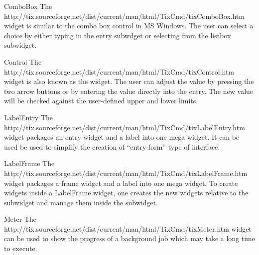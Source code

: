 
\begin{classdesc}{ComboBox}{}
The 
{http://tix.sourceforge.net/dist/current/man/html/TixCmd/tixComboBox.htm}
widget is similar to the combo box control in MS Windows. The user can
select a choice by either typing in the entry subwdget or selecting
from the listbox subwidget.
\end{classdesc}


\begin{classdesc}{Control}{}
The 
{http://tix.sourceforge.net/dist/current/man/html/TixCmd/tixControl.htm}
widget is also known as the  widget. The user can
adjust the value by pressing the two arrow buttons or by entering the
value directly into the entry. The new value will be checked against
the user-defined upper and lower limits.
\end{classdesc}


\begin{classdesc}{LabelEntry}{}
The 
{http://tix.sourceforge.net/dist/current/man/html/TixCmd/tixLabelEntry.htm}
widget packages an entry widget and a label into one mega widget. It
can be used be used to simplify the creation of ``entry-form'' type of
interface.
\end{classdesc}


\begin{classdesc}{LabelFrame}{}
The 
{http://tix.sourceforge.net/dist/current/man/html/TixCmd/tixLabelFrame.htm}
widget packages a frame widget and a label into one mega widget.  To
create widgets inside a LabelFrame widget, one creates the new widgets
relative to the  subwidget and manage them inside the
 subwidget.
\end{classdesc}


\begin{classdesc}{Meter}{}
The 
{http://tix.sourceforge.net/dist/current/man/html/TixCmd/tixMeter.htm}
widget can be used to show the progress of a background job which may
take a long time to execute.
\end{classdesc}

